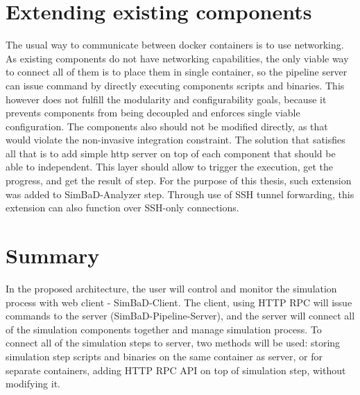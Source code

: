 \section{Extending existing components}
The usual way to communicate between docker containers is to use networking. As existing components do not have networking capabilities, the only viable way to connect all of them is to place them in single container, so the pipeline server can issue command by directly executing components scripts and binaries. This however does not fulfill the modularity and configurability goals, because it prevents components from being decoupled and enforces single viable configuration. The components also should not be modified directly, as that would violate the non-invasive integration constraint. The solution that satisfies all that is to add simple http server on top of each component that should be able to independent. This layer should allow to trigger the execution, get the progress, and get the result of step. For the purpose of this thesis, such extension was added to SimBaD-Analyzer step. Through use of SSH tunnel forwarding, this extension can also function over SSH-only connections.
\section{Summary}
In the proposed architecture, the user will control and monitor the simulation process with web client - SimBaD-Client. The client, using HTTP RPC will issue commands to the server (SimBaD-Pipeline-Server), and the server will connect all of the simulation components together and manage simulation process. To connect all of the simulation steps to server, two methods will be used: storing simulation step scripts and binaries on the same container as server, or for separate containers, adding HTTP RPC API on top of simulation step, without modifying it.